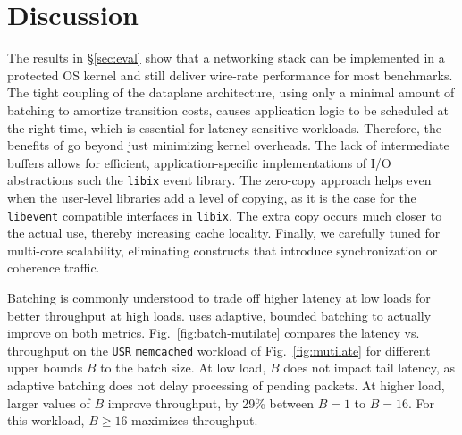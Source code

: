 
\section{Discussion}
\label{sec:disc}


 The results in \S\ref{sec:eval}
show that a networking stack can be implemented in a protected OS
kernel and still deliver wire-rate performance for most benchmarks.
The tight coupling of the dataplane architecture, using only a minimal
amount of batching to amortize transition costs, causes application
logic to be scheduled at the right time, which is essential for
latency-sensitive workloads.  Therefore, the benefits of \ix go beyond
just minimizing kernel overheads. The lack of intermediate buffers
allows for efficient, application-specific implementations of I/O
abstractions such the \texttt{libix} event library. The zero-copy
approach helps even when the user-level libraries add a level of
copying, as it is the case for the \texttt{libevent} compatible
interfaces in \texttt{libix}.  The extra copy occurs much closer to
the actual use, thereby increasing cache locality.  Finally, we
carefully tuned \ix for multi-core scalability, eliminating constructs
that introduce synchronization or coherence traffic.






 Batching is commonly
understood to trade off higher latency at low loads for better
throughput at high loads.  \ix uses adaptive, bounded batching to
actually improve on both metrics.  Fig.~\ref{fig:batch-mutilate}
compares the latency vs. throughput on the \texttt{USR}
\texttt{memcached} workload of Fig.~\ref{fig:mutilate} for different
upper bounds $B$ to the batch size.  At low load, $B$ does not impact
tail latency, as adaptive batching does not delay processing of
pending packets.  At higher load, larger values of $B$ improve
throughput, by 29\% between $B=1$ to $B=16$.  For this workload, $B
\ge 16$ maximizes throughput.


